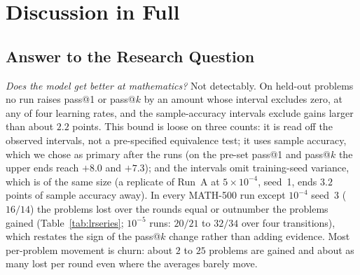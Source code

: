\documentclass[runningheads]{llncs}
\begin{document}
\section{Discussion in Full}
\label{app:discussion}

\subsection{Answer to the Research Question}
\emph{Does the model get better at mathematics?} Not detectably. On held-out
problems no run raises pass@1 or pass@$k$ by an amount whose interval excludes
zero, at any of four learning rates, and the sample-accuracy intervals exclude
gains larger than about $2.2$ points. This bound is loose on three counts: it
is read off the observed intervals, not a pre-specified equivalence test; it
uses sample accuracy, which we chose as primary after the runs (on the pre-set
pass@1 and pass@$k$ the upper ends reach $+8.0$ and $+7.3$); and the intervals
omit training-seed variance, which is of the same size (a replicate of Run~A at
$5\times10^{-4}$, seed~1, ends $3.2$ points of sample accuracy away). In every MATH-500 run except
$10^{-4}$ seed~3 ($16/14$) the problems lost over the rounds equal or outnumber
the problems gained (Table~\ref{tab:lrseries}; $10^{-5}$ runs: $20/21$ to $32/34$
over four transitions), which restates the sign of the pass@$k$ change rather
than adding evidence. Most per-problem movement is churn: about $2$ to $25$
problems are gained and about as many lost per round even where the averages
barely move.
\end{document}
